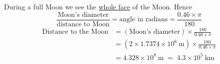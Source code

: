 During a full Moon we see the \underline{whole face} of the Moon. Hence
\[
\frac{\text{Moon's diameter}}{\text{distance to Moon}}
  = \text{angle in radians}
  = \frac{0.46 \times \pi}{180}
\]
\begin{align*}
\text{Distance to the Moon}
  &= \left(\text{Moon's diameter}\right)\times\frac{180}{0.46\times\pi}\\
  &= \left(2\times 1.7374\times 10^{6}\ \mathrm{m}\right)
     \times\frac{180}{0.46\times\pi}\\
  &= 4.328\times 10^{8}\ \mathrm{m} \;=\; 4.3\times 10^{5}\ \mathrm{km}
\end{align*}
